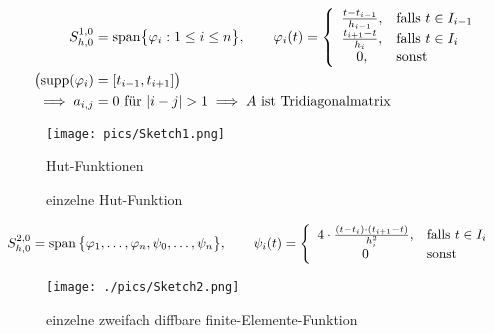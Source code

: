 \begin{align*}
	S^{1,0}_{h,0}&=\text{span}\big\lbrace\varphi_i:1\leq i\leq n\big\rbrace,\qquad
	\varphi_i(t)=\left\lbrace\begin{array}{cl}
		\frac{t-t_{i-1}}{h_{i-1}}, &\falls t\in I_{i-1}\\
		\frac{t_{i+1}-t}{h_i}, &\falls t\in I_i\\
		0, &\sonst
	\end{array}\right.\\
	\big(\text{supp}(\varphi_i) &= [t_{i-1}, t_{i+1}]\big)\\
	\implies a_{i,j}&=0\text{ für }|i-j|>1\implies A\text{ ist Tridiagonalmatrix}
\end{align*}

\begin{figure}[!ht]
	\begin{center}
		\texttt{[image: pics/Sketch1.png]}
		\caption{Hut-Funktionen}
		\label{AbbHutFunktionen}
	\end{center}
\end{figure}

\begin{figure}[!ht]
	\begin{center}
		
		\caption{einzelne Hut-Funktion}
		\label{AbbPhiHat}
	\end{center}
\end{figure}

\begin{align*}
	S_{h,0}^{2,0}&=\operatorname{span}\big\lbrace\varphi_1,\ldots,\varphi_n,\psi_0,\ldots,\psi_n\big\rbrace,\qquad
	\psi_i(t)=\left\lbrace\begin{array}{cl}
		4\cdot\frac{(t-t_i)\cdot(t_{i+1}-t)}{h_i^2}, &\text{falls } t\in I_i\\
		0 &\text{sonst }
	\end{array}\right.
\end{align*}

\begin{figure}[!ht]
	\begin{center}
		\texttt{[image: ./pics/Sketch2.png]}
		\caption{einzelne zweifach diffbare finite-Elemente-Funktion}
		\label{AbbFiniteElementeFunktionZweifachDiffbar}
	\end{center}
\end{figure}


